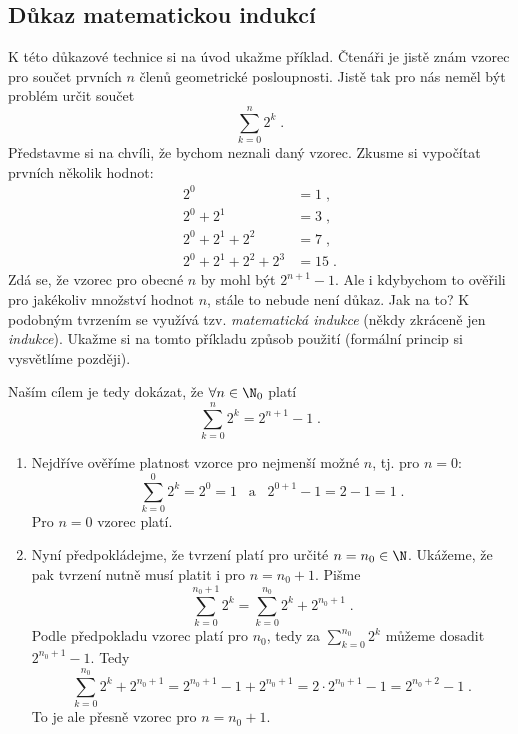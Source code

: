 \subsection{Důkaz matematickou indukcí}\label{subsec:dukaz_indukci}
K této důkazové technice si na úvod ukažme příklad. Čtenáři je jistě znám vzorec pro součet prvních $n$ členů geometrické posloupnosti. Jistě tak pro nás neměl být problém určit součet
\begin{equation*}
    \sum_{k=0}^{n}{2^k}\; .
\end{equation*}
Představme si na chvíli, že bychom neznali daný vzorec. Zkusme si vypočítat prvních několik hodnot:
\begin{align*}
    2^0&=1\; ,\\
    2^0+2^1&=3\; ,\\
    2^0+2^1+2^2&=7\; ,\\
    2^0+2^1+2^2+2^3&=15\; .
\end{align*}
Zdá se, že vzorec pro obecné $n$ by mohl být $2^{n+1}-1$. Ale i kdybychom to ověřili pro jakékoliv množství hodnot $n$, stále to nebude není důkaz. Jak na to? K podobným tvrzením se využívá tzv. \emph{matematická indukce} (někdy zkráceně jen \emph{indukce}). Ukažme si na tomto příkladu způsob použití (formální princip si vysvětlíme později).\par
Naším cílem je tedy dokázat, že $\forall n\in\N_0$ platí
\begin{equation*}
    \sum_{k=0}^{n}{2^k}=2^{n+1}-1\; .
\end{equation*}
\begin{enumerate}[label=(\roman*)]
    \item\label{item:zaklad_indukce} Nejdříve ověříme platnost vzorce pro nejmenší možné $n$, tj. pro $n=0$:
    \begin{equation*}
        \sum_{k=0}^{0}{2^k}=2^0=1\;\;\;\text{a}\;\;\;2^{0+1}-1=2-1=1\; .
    \end{equation*}
    Pro $n=0$ vzorec platí.
    \item\label{item:indukcni_krok} Nyní předpokládejme, že tvrzení platí pro určité $n=n_0\in\N$. Ukážeme, že pak tvrzení nutně musí platit i pro $n=n_0+1$. Pišme
    \begin{equation*}
        \sum_{k=0}^{n_0+1}{2^k}=\sum_{k=0}^{n_0}{2^k}+2^{n_0+1}\; .
    \end{equation*}
    Podle předpokladu vzorec platí pro $n_0$, tedy za $\sum_{k=0}^{n_0}{2^k}$ můžeme dosadit $2^{n_0+1}-1$. Tedy
    \begin{equation*}
        \sum_{k=0}^{n_0}{2^k}+2^{n_0+1}=2^{n_0+1}-1+2^{n_0+1}=2\cdot 2^{n_0+1}-1=2^{n_0+2}-1\; .
    \end{equation*}
    To je ale přesně vzorec pro $n=n_0+1$.
\end{enumerate}
